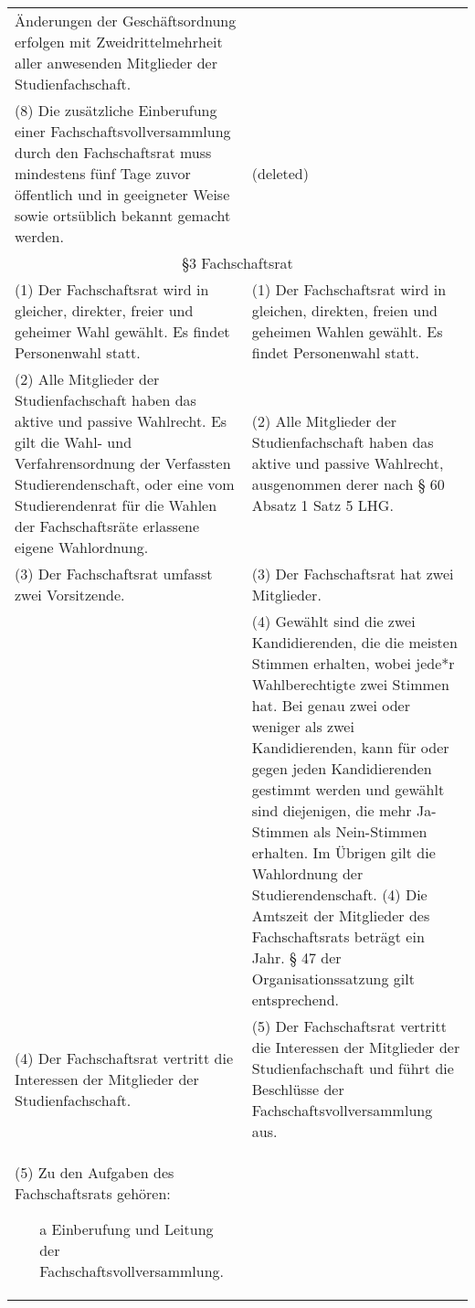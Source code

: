 {\begin{longtable}{|p{7.5cm}|p{7.5cm}|}
        Änderungen der Geschäftsordnung erfolgen mit Zweidrittelmehrheit aller anwesenden
        Mitglieder der Studienfachschaft.\\
        (8) Die zusätzliche Einberufung einer Fachschaftsvollversammlung durch den Fachschaftsrat muss mindestens
        fünf Tage zuvor öffentlich und in geeigneter Weise sowie ortsüblich bekannt gemacht werden.
    &   (deleted)\\\hline
        \multicolumn{2}{|c|}{§3 Fachschaftsrat}\\\hline
        (1) Der Fachschaftsrat wird in gleicher, direkter, freier und geheimer Wahl gewählt.
        Es findet Personenwahl statt.&
        (1) Der Fachschaftsrat wird in gleichen, direkten, freien und geheimen Wahlen
        gewählt. Es findet Personenwahl statt.\\
        (2) Alle Mitglieder der Studienfachschaft haben das aktive und passive Wahlrecht. Es gilt
        die Wahl- und Verfahrensordnung der Verfassten Studierendenschaft, oder eine vom
        Studierendenrat für die Wahlen der Fachschaftsräte erlassene eigene Wahlordnung.&
        (2) Alle Mitglieder der Studienfachschaft haben das aktive und passive Wahlrecht,
        ausgenommen derer nach § 60 Absatz 1 Satz 5 LHG.\\
        (3) Der Fachschaftsrat umfasst zwei Vorsitzende.&
        (3) Der Fachschaftsrat hat zwei Mitglieder.\\
        &(4) Gewählt sind die zwei Kandidierenden, die die meisten Stimmen erhalten, wobei jede*r
        Wahlberechtigte zwei Stimmen hat. Bei genau zwei oder weniger als zwei Kandidierenden,
        kann für oder gegen jeden Kandidierenden gestimmt werden und gewählt sind diejenigen, die mehr
        Ja-Stimmen als Nein-Stimmen erhalten. Im Übrigen gilt die Wahlordnung der Studierendenschaft.\newline
        (4) Die Amtszeit der Mitglieder des Fachschaftsrats beträgt ein Jahr. § 47 der
        Organisationssatzung gilt entsprechend.\\
        (4) Der Fachschaftsrat vertritt die Interessen der Mitglieder der Studienfachschaft.&
        (5) Der Fachschaftsrat vertritt die Interessen der Mitglieder der Studienfachschaft und
        führt die Beschlüsse der Fachschaftsvollversammlung aus.\\  
        (5) Zu den Aufgaben des Fachschaftsrats gehören:
        \begin{enumerate}
            \item[a] Einberufung und Leitung der Fachschaftsvollversammlung.

\end{enumerate}
\end{longtable}}
